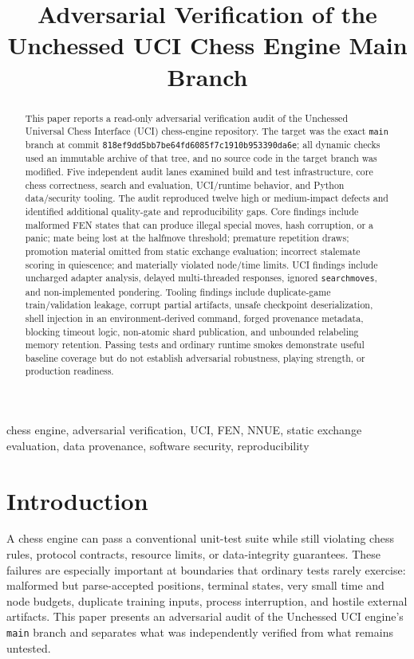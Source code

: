 \documentclass[conference]{IEEEtran}
\title{Adversarial Verification of the Unchessed UCI Chess Engine Main Branch}
\author{\IEEEauthorblockN{Manus AI}
\IEEEauthorblockA{Read-Only Verification and Research Facilities\\
Unchessed-UCI-Engine\\
Audit branch: \code{manus/research-facilities}}}
\newcommand{\code}[1]{\texttt{\small #1}}
\begin{document}
\maketitle
\begin{abstract}
This paper reports a read-only adversarial verification audit of the Unchessed Universal Chess Interface (UCI) chess-engine repository. The target was the exact \code{main} branch at commit \code{818ef9dd5bb7be64fd6085f7c1910b953390da6e}; all dynamic checks used an immutable archive of that tree, and no source code in the target branch was modified. Five independent audit lanes examined build and test infrastructure, core chess correctness, search and evaluation, UCI/runtime behavior, and Python data/security tooling. The audit reproduced twelve high or medium-impact defects and identified additional quality-gate and reproducibility gaps. Core findings include malformed FEN states that can produce illegal special moves, hash corruption, or a panic; mate being lost at the halfmove threshold; premature repetition draws; promotion material omitted from static exchange evaluation; incorrect stalemate scoring in quiescence; and materially violated node/time limits. UCI findings include uncharged adapter analysis, delayed multi-threaded responses, ignored \code{searchmoves}, and non-implemented pondering. Tooling findings include duplicate-game train/validation leakage, corrupt partial artifacts, unsafe checkpoint deserialization, shell injection in an environment-derived command, forged provenance metadata, blocking timeout logic, non-atomic shard publication, and unbounded relabeling memory retention. Passing tests and ordinary runtime smokes demonstrate useful baseline coverage but do not establish adversarial robustness, playing strength, or production readiness.
\end{abstract}
\begin{IEEEkeywords}
chess engine, adversarial verification, UCI, FEN, NNUE, static exchange evaluation, data provenance, software security, reproducibility
\end{IEEEkeywords}

\section{Introduction}
A chess engine can pass a conventional unit-test suite while still violating chess rules, protocol contracts, resource limits, or data-integrity guarantees. These failures are especially important at boundaries that ordinary tests rarely exercise: malformed but parse-accepted positions, terminal states, very small time and node budgets, duplicate training inputs, process interruption, and hostile external artifacts. This paper presents an adversarial audit of the Unchessed UCI engine's \code{main} branch and separates what was independently verified from what remains untested.
\end{document}
